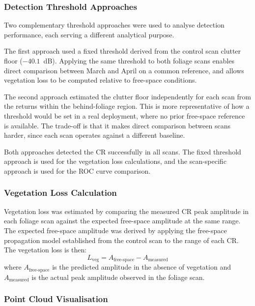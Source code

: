\subsubsection*{Detection Threshold Approaches}

Two complementary threshold approaches were used to analyse detection
performance, each serving a different analytical purpose.

The first approach used a fixed threshold derived from the control scan
clutter floor ($-40.1$~dB).
Applying the same threshold to both foliage scans enables direct comparison
between March and April on a common reference, and allows vegetation loss to
be computed relative to free-space conditions.

The second approach estimated the clutter floor independently for each scan
from the returns within the behind-foliage region.
This is more representative of how a threshold would be set in a real
deployment, where no prior free-space reference is available.
The trade-off is that it makes direct comparison between scans harder, since
each scan operates against a different baseline.

Both approaches detected the CR successfully in all scans.
The fixed threshold approach is used for the vegetation loss calculations,
and the scan-specific approach is used for the ROC curve comparison.

\subsubsection*{Vegetation Loss Calculation}

Vegetation loss was estimated by comparing the measured CR peak amplitude
in each foliage scan against the expected free-space amplitude at the same
range.
The expected free-space amplitude was derived by applying the free-space
propagation model established from the control scan to the range of each CR.
The vegetation loss is then:
\[
  L_{\text{veg}} = A_{\text{free-space}} - A_{\text{measured}}
\]
where $A_{\text{free-space}}$ is the predicted amplitude in the absence of
vegetation and $A_{\text{measured}}$ is the actual peak amplitude observed
in the foliage scan.



\subsubsection*{Point Cloud Visualisation}

